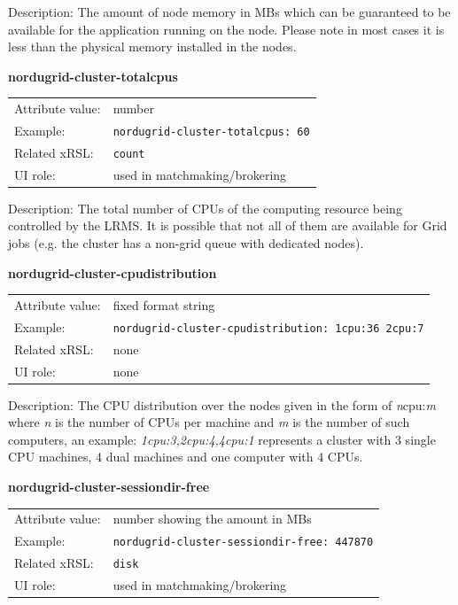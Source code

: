 \documentclass{article}
\begin{document}
Description: The amount of node memory in MBs which can be guaranteed to be
available for the application running on the node. Please note in most cases
it is less than the physical memory installed in the nodes.


  \hspace*{0.5cm}
  \begin{shaded}
    \textbf{nordugrid-cluster-totalcpus}
  \end{shaded}
  \begin{tabular}{lp{10cm}}  
    Attribute value:& number\\
    Example:& \verb#nordugrid-cluster-totalcpus: 60#\\
    Related xRSL:& \verb#count#\\
    UI role:& used in matchmaking/brokering\\
  \end{tabular}

Description: The total number of CPUs of the computing resource being controlled by the
LRMS. It is possible that not all of them are available for Grid jobs (e.g. the cluster
has a non-grid queue with dedicated nodes).


  \hspace*{0.5cm}
  \begin{shaded}
    \textbf{nordugrid-cluster-cpudistribution}
  \end{shaded}
  \begin{tabular}{lp{10cm}}  
    Attribute value:& fixed format string\\
    Example:& \verb#nordugrid-cluster-cpudistribution: 1cpu:36 2cpu:7#\\
    Related xRSL:& none\\
    UI role:& none\\
  \end{tabular}

Description:  The CPU distribution over the nodes given in the form of 
{\it n}cpu:{\it m} where {\it n} is the number of CPUs per machine and {\it m} 
is the number of such computers, an example: {\it 1cpu:3,2cpu:4,4cpu:1}
represents a cluster with 3 single CPU machines, 4 dual machines 
and one computer with 4 CPUs.


  \hspace*{0.5cm}
  \begin{shaded}
    \textbf{nordugrid-cluster-sessiondir-free}
  \end{shaded}
  \begin{tabular}{lp{10cm}}  
    Attribute value:& number showing the amount in MBs\\
    Example: &\verb#nordugrid-cluster-sessiondir-free: 447870#\\
    Related xRSL:& \verb#disk#\\
    UI role:& used in matchmaking/brokering\\
  \end{tabular}
\end{document}
